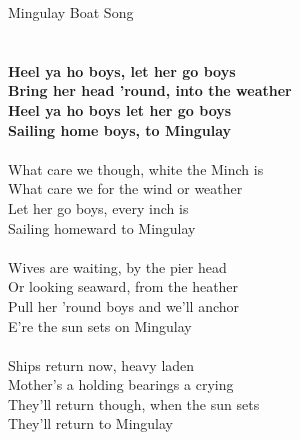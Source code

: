 \documentclass[letterpaper,9pt]{article}
\begin{document}
\newpage
{}
\huge
Mingulay Boat Song\\
\\
\huge
\\\textbf{Heel ya ho boys, let her go boys
\\Bring her head 'round, into the weather
\\Heel ya ho boys let her go boys
\\Sailing home boys, to Mingulay}
\\
\\What care we though, white the Minch is
\\What care we for the wind or weather
\\Let her go boys, every inch is
\\Sailing homeward to Mingulay
\\
\\Wives are waiting, by the pier head
\\Or looking seaward, from the heather
\\Pull her 'round boys and we'll anchor
\\E're the sun sets on Mingulay
\\
\\Ships return now, heavy laden
\\Mother's a holding bearings a crying
\\They'll return though, when the sun sets
\\They'll return to Mingulay
\end{document}
